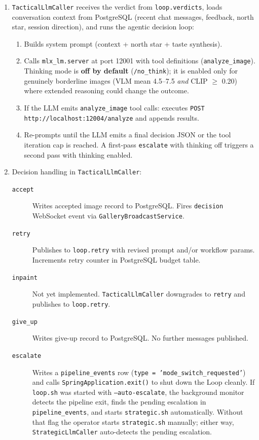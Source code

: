 \documentclass[11pt,letterpaper]{article}
\begin{document}
\begin{enumerate}
  \item \texttt{TacticalLlmCaller} receives the verdict from
        \texttt{loop.verdicts}, loads conversation context from PostgreSQL
        (recent chat messages, feedback, north star, session direction), and
        runs the agentic decision loop:
    \begin{enumerate}
      \item Builds system prompt (context + north star + taste synthesis).
      \item Calls \texttt{mlx\_lm.server} at port 12001 with tool definitions
            (\texttt{analyze\_image}). Thinking mode is \textbf{off by default}
            (\texttt{/no\_think}); it is enabled only for genuinely borderline
            images (VLM mean 4.5--7.5 \textit{and} CLIP $\geq$ 0.20) where
            extended reasoning could change the outcome.
      \item If the LLM emits \texttt{analyze\_image} tool calls: executes
            \texttt{POST http://localhost:12004/analyze} and appends results.
      \item Re-prompts until the LLM emits a final decision JSON or the tool
            iteration cap is reached. A first-pass \texttt{escalate} with
            thinking off triggers a second pass with thinking enabled.
    \end{enumerate}

  \item Decision handling in \texttt{TacticalLlmCaller}:
    \begin{description}
      \item[\texttt{accept}] Writes accepted image record to PostgreSQL.
            Fires \texttt{decision} WebSocket event via
            \texttt{GalleryBroadcastService}.
      \item[\texttt{retry}] Publishes to \texttt{loop.retry} with revised
            prompt and/or workflow params. Increments retry counter in
            PostgreSQL budget table.
      \item[\texttt{inpaint}] Not yet implemented. \texttt{TacticalLlmCaller}
            downgrades to \texttt{retry} and publishes to \texttt{loop.retry}.
      \item[\texttt{give\_up}] Writes give-up record to PostgreSQL. No further
            messages published.
      \item[\texttt{escalate}] Writes a \texttt{pipeline\_events} row
            (\texttt{type = 'mode\_switch\_requested'}) and calls
            \texttt{SpringApplication.exit()} to shut down the Loop cleanly.
            If \texttt{loop.sh} was started with \texttt{--auto-escalate}, the
            background monitor detects the pipeline exit, finds the pending
            escalation in \texttt{pipeline\_events}, and starts
            \texttt{strategic.sh} automatically. Without that flag the operator
            starts \texttt{strategic.sh} manually; either way,
            \texttt{StrategicLlmCaller} auto-detects the pending escalation.
    \end{description}
\end{enumerate}
\end{document}
